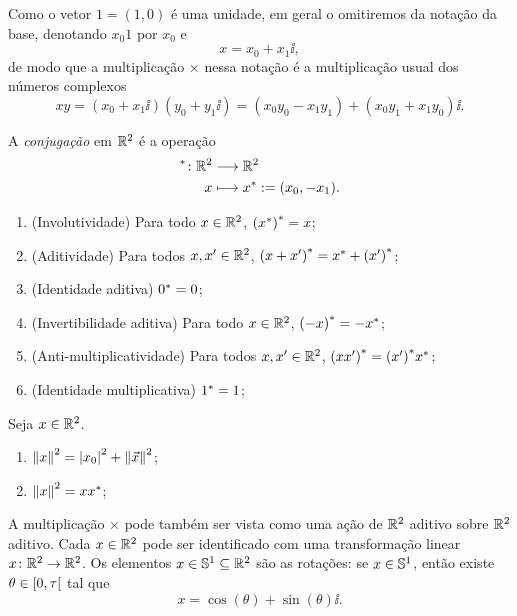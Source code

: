 Como o vetor $1=(1,0)$ é uma unidade, em geral o omitiremos da notação da base, denotando $x_0 1$ por $x_0$ e
	\begin{equation*}
	x = x_0 + x_1\ii,
	\end{equation*}
de modo que a multiplicação $\times$ nessa notação é a multiplicação usual dos números complexos
	\begin{equation*}
	xy = (x_0 + x_1 \ii)(y_0 + y_1 \ii) = (x_0y_0-x_1y_1) + (x_0y_1+x_1y_0) \ii.
	\end{equation*}

\begin{definition}
A \emph{conjugação} em $\R^2$ é a operação
	\begin{align*}
	\func{\conju{}}{\R^2}{\R^2}{x}{\conju{x} := (x_0,-x_1)}.
	\end{align*}
\end{definition}

\begin{exercise}
	\begin{enumerate}
	\item (Involutividade) Para todo $x \in \R^2$, $\conju{(\conju{x})} = x$;
	\item (Aditividade) Para todos $x,x' \in \R^2$, $\conju{(x+x')} = \conju{x} + \conju{(x')}$;
	\item (Identidade aditiva) $\conju{0} = 0$;
	\item (Invertibilidade aditiva) Para todo $x \in \R^2$, $\conju{(-x)} = -\conju{x}$;
	\item (Anti-multiplicatividade) Para todos $x,x' \in \R^2$, $\conju{(xx')} = \conju{(x')}\conju{x}$;
	\item (Identidade multiplicativa) $\conju{1} = 1$;
	\end{enumerate}
\end{exercise}

\begin{exercise}
Seja $x \in \R^2$.
	\begin{enumerate}
	\item $\nor{x}^2 = \abs{\esc{x}}^2 + \nor{\vec{x}}^2$;
	\item $\nor{x}^2 = x\conju{x}$;
	\end{enumerate}
\end{exercise}


A multiplicação $\times$ pode também ser vista como uma ação de $\R^2$ aditivo sobre $\R^2$ aditivo. Cada $x \in \R^2$ pode ser identificado com uma transformação linear $x\colon \R^2 \to \R^2$. Os elementos $x \in \S^1 \subseteq \R^2$ são as rotações: se $x \in \S^1$, então existe $\theta \in \intfa{0}{\tau}$ tal que
	\begin{equation*}
	x = \cos(\theta) + \sin(\theta) \ii.
	\end{equation*}

